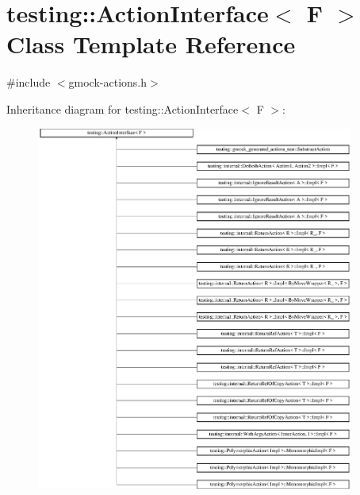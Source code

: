 \hypertarget{classtesting_1_1_action_interface}{}\section{testing\+::Action\+Interface$<$ F $>$ Class Template Reference}
\label{classtesting_1_1_action_interface}


{\ttfamily \#include $<$gmock-\/actions.\+h$>$}

Inheritance diagram for testing\+::Action\+Interface$<$ F $>$\+:\begin{figure}[H]
\begin{center}
\leavevmode
\includegraphics[height=12.000000cm]{d6/d8c/classtesting_1_1_action_interface}
\end{center}
\end{figure}
